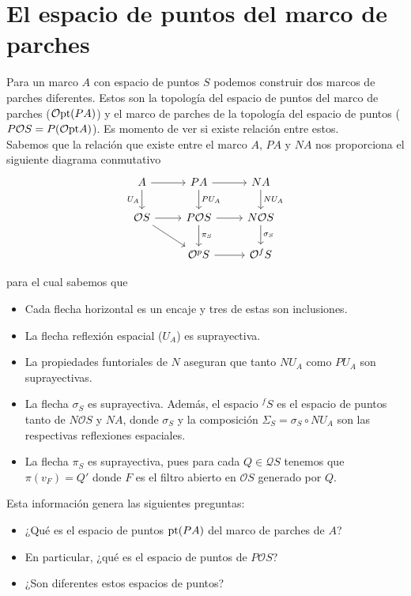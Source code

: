 \section{El espacio de puntos del marco de parches}

Para un marco $A$ con espacio de puntos $S$ podemos construir dos marcos de parches diferentes. Estos son la topología del espacio de puntos del marco de parches ($\mathcal{O}\mathrm{pt}(PA)$) y el marco de parches de la topología del espacio de puntos ($P\mathcal{O}S=P(\mathcal{O}\mathrm{pt} A)$). Es momento de ver si existe relación entre estos.\\

Sabemos que la relación que existe entre el marco $A$, $PA$ y $NA$ nos proporciona el siguiente diagrama conmutativo
\[\begin{tikzcd}
	A & PA & NA \\
	{\mathcal{O}S} & {P\mathcal{O}S} & {N\mathcal{O}S} \\
	& {\mathcal{O}^pS} & {\mathcal{O}^fS}
	\arrow[from=1-1, to=1-2]
	\arrow["{U_A}"', from=1-1, to=2-1]
	\arrow[from=1-2, to=1-3]
	\arrow["{PU_A}", from=1-2, to=2-2]
	\arrow["{NU_A}", from=1-3, to=2-3]
	\arrow[from=2-1, to=2-2]
	\arrow[from=2-1, to=3-2]
	\arrow[from=2-2, to=2-3]
	\arrow["{\pi_S}", from=2-2, to=3-2]
	\arrow["{\sigma_S}", from=2-3, to=3-3]
	\arrow[from=3-2, to=3-3]
\end{tikzcd}\]

para el cual sabemos que
\begin{itemize}
    \item Cada flecha horizontal es un encaje y tres de estas son inclusiones.
    \item La flecha reflexión espacial ($U_A$) es suprayectiva.
    \item La propiedades funtoriales de $N$ aseguran que tanto $NU_A$ como $PU_A$ son suprayectivas.
    \item La flecha $\sigma_S$ es suprayectiva. Además, el espacio $^fS$ es el espacio de puntos tanto de $N\mathcal{O}S$ y $NA$, donde $\sigma_S$ y la composición $\Sigma_S=\sigma_S\circ NU_A$ son las respectivas reflexiones espaciales.
    \item La flecha $\pi_S$ es suprayectiva, pues para cada $Q\in \mathcal{Q}S$ tenemos que $\pi(v_F)=Q'$ donde $F$ es el filtro abierto en $\mathcal{O}S$ generado por $Q$.
\end{itemize}

Esta información genera las siguientes preguntas:
\begin{itemize}
    \item ¿Qué es el espacio de puntos $\mathrm{pt} (PA)$ del marco de parches de $A$?
    \item En particular, ¿qué es el espacio de puntos de $P\mathcal{O}S$?
    \item ¿Son diferentes estos espacios de puntos?
\end{itemize}

